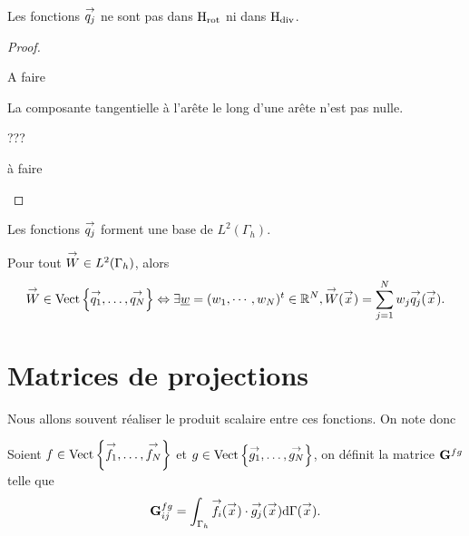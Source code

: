     \begin{prop}
      Les fonctions \({\overset{\rightarrow}{q_j}}\) ne sont pas dans \(\mathrm{H}_\mathrm{rot}\) ni dans \(\mathrm{H}_\mathrm{div}\).
    \end{prop}
    \begin{proof}
      \begin{TODO}
        A faire
      \end{TODO}
      La composante tangentielle à l'arête le long d'une arête n'est pas nulle.
\begin{REM}
  ???
\end{REM}
\begin{REP}
  à faire
\end{REP}
    \end{proof}

    \begin{prop}
      Les fonctions \({\overset{\rightarrow}{q_j}}\) forment une base de \(L^2(\Gamma_h)\).
    \end{prop}

    \begin{defn}
      Pour tout \({\overset{\rightarrow}{W}} \in L^2(\Gamma_h)\), alors
      \begin{equation*}
        {\overset{\rightarrow}{W}} \in \operatorname{Vect}\left\lbrace{\overset{\rightarrow}{q_1}},\ldots,{\overset{\rightarrow}{q_N}}\right\rbrace \Leftrightarrow \exists {\underline{w}} = (w_1,\cdots,w_N)^t \in \mathbb R^N, {\overset{\rightarrow}{W}}({\overset{\rightarrow}{x}}) = \sum_{j=1}^N w_j {\overset{\rightarrow}{q_j}}({\overset{\rightarrow}{x}}).
      \end{equation*}
    \end{defn}


\section{Matrices de projections}

  Nous allons souvent réaliser le produit scalaire entre ces fonctions. On note donc
  \begin{defn}
    Soient \(f \in \operatorname{Vect}\left\lbrace{\overset{\rightarrow}{f_1}},\ldots,{\overset{\rightarrow}{f_N}}\right\rbrace\) et \(g \in \operatorname{Vect}\left\lbrace{\overset{\rightarrow}{g_1}},\ldots,{\overset{\rightarrow}{g_N}}\right\rbrace\), on définit la matrice \(\mathbf{G}^{fg}\) telle que
    \begin{equation*}
      \mathbf{G}^{fg}_{ij} = \int_{\Gamma_h} {\overset{\rightarrow}{f_i}}({\overset{\rightarrow}{x}})\cdot {\overset{\rightarrow}{g_j}}({\overset{\rightarrow}{x}}) \mathrm{d}{\Gamma}({\overset{\rightarrow}{x}}).
    \end{equation*}
  \end{defn}

